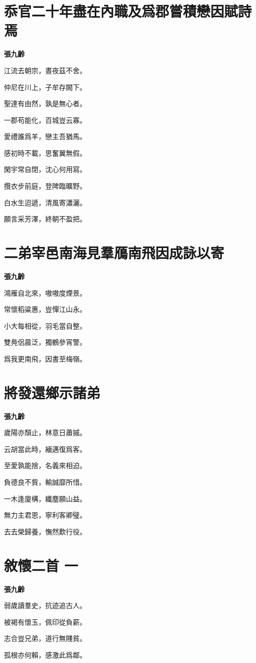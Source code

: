 \documentclass[12pt,a4paper]{ctexbook}
\begin{document}
\section{忝官二十年盡在內職及爲郡嘗積戀因賦詩焉}
\textbf{張九齡}\par\vspace{0.5em}
江流去朝宗，晝夜茲不舍。\par
仲尼在川上，子牟存闕下。\par
聖達有由然，孰是無心者。\par
一郡苟能化，百城豈云寡。\par
愛禮誰爲羊，戀主吾猶馬。\par
感初時不載，思奮翼無假。\par
閑宇常自閉，沈心何用寫。\par
攬衣步前庭，登陴臨曠野。\par
白水生迢遞，清風寄瀟灑。\par
願言采芳澤，終朝不盈把。\par

\section{二弟宰邑南海見羣鴈南飛因成詠以寄}
\textbf{張九齡}\par\vspace{0.5em}
鴻雁自北來，嗷嗷度煙景。\par
常懷稻粱惠，豈憚江山永。\par
小大每相從，羽毛當自整。\par
雙鳧侶晨泛，獨鶴參宵警。\par
爲我更南飛，因書至梅嶺。\par

\section{將發還鄉示諸弟}
\textbf{張九齡}\par\vspace{0.5em}
歲陽亦頹止，林意日蕭摵。\par
云胡當此時，緬邁復爲客。\par
至愛孰能捨，名義來相迫。\par
負德良不貲，輸誠靡所惜。\par
一木逢廈構，纖塵願山益。\par
無力主君恩，寧利客卿璧。\par
去去榮歸養，憮然歎行役。\par

\section{敘懷二首 一}
\textbf{張九齡}\par\vspace{0.5em}
弱歲讀羣史，抗迹追古人。\par
被褐有懷玉，佩印從負薪。\par
志合豈兄弟，道行無賤貧。\par
孤根亦何賴，感激此爲鄰。\par
\end{document}
